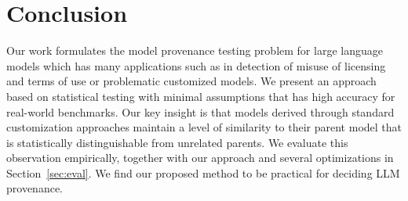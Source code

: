 \section{Conclusion}

Our work formulates the model provenance testing problem for large language models which has many applications such as in detection of misuse of licensing and terms of use or problematic customized models. We present an approach based on statistical testing with minimal assumptions that has high accuracy for real-world benchmarks. Our key insight is that models derived through standard customization approaches maintain a level of similarity to their parent model that is statistically distinguishable from unrelated parents. We evaluate this observation empirically, together with our approach and several optimizations in Section~\ref{sec:eval}. We find our proposed method to be practical for deciding LLM provenance.
